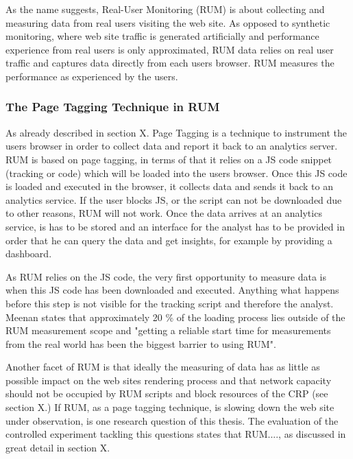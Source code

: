 As the name suggests, Real-User Monitoring (RUM) is about collecting and measuring data from real users visiting the web site.
As opposed to synthetic monitoring, where web site traffic is generated artificially and performance experience from real users is only approximated, RUM data relies on real user traffic and captures data directly from each users browser. 
RUM measures the performance as experienced by the users. %



\subsubsection{The Page Tagging Technique in RUM}


As already described in section X. Page Tagging is a technique to instrument the users browser in order to collect data and report it back to an analytics server.
RUM is based on page tagging, in terms of that it relies on a JS code snippet (tracking or code) which will be loaded into the users browser.
Once this JS code is loaded and executed in the browser, it collects data and sends it back to an analytics service.
If the user blocks JS, or the script can not be downloaded due to other reasons,  RUM will not work.
Once the data arrives at an analytics service, is has to be stored and an interface for the analyst has to be provided in order that he can query the data and get insights, for example by providing a dashboard. %

As RUM relies on the JS code, the very first opportunity to measure data is when this JS code has been downloaded and executed.
Anything what happens before this step is not visible for the tracking script and therefore the analyst.
Meenan states that approximately 20 \% of the loading process lies outside of the RUM measurement scope and "getting a reliable start time for measurements from the real world has been the biggest barrier to using RUM".%

Another facet of RUM is that ideally the measuring of data has as little as possible impact on the web sites rendering process and that network capacity should not be occupied by RUM scripts and block resources of the CRP (see section X.) %
If RUM, as a page tagging technique, is slowing down the web site under observation, is one research question of this thesis.
The evaluation of the controlled experiment tackling this questions states that RUM...., as discussed in great detail in section X. %


